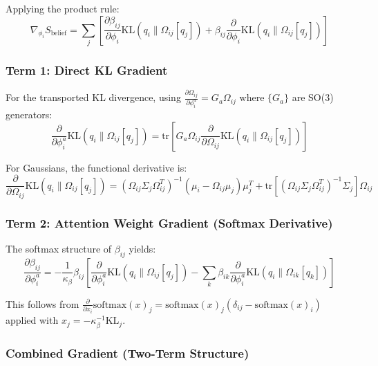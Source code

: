 \documentclass[11pt]{article}
\begin{document}
Applying the product rule:
\begin{equation}
\nabla_{\phi_i} S_{\mathrm{belief}} = \sum_j \left[ \frac{\partial \beta_{ij}}{\partial \phi_i} \mathrm{KL}(q_i \| \Omega_{ij}[q_j]) + \beta_{ij} \frac{\partial}{\partial \phi_i}\mathrm{KL}(q_i \| \Omega_{ij}[q_j]) \right]
\end{equation}

\subsubsection*{Term 1: Direct KL Gradient}

For the transported KL divergence, using $\frac{\partial \Omega_{ij}}{\partial \phi_i^a} = G_a \Omega_{ij}$ where $\{G_a\}$ are SO(3) generators:
\begin{equation}
\frac{\partial}{\partial \phi_i^a}\mathrm{KL}(q_i \| \Omega_{ij}[q_j]) = \mathrm{tr}\left[G_a \Omega_{ij} \frac{\partial}{\partial \Omega_{ij}}\mathrm{KL}(q_i \| \Omega_{ij}[q_j])\right]
\end{equation}

For Gaussians, the functional derivative is:
\begin{equation}
\frac{\partial}{\partial \Omega_{ij}}\mathrm{KL}(q_i \| \Omega_{ij}[q_j]) = (\Omega_{ij}\Sigma_j\Omega_{ij}^T)^{-1}(\mu_i - \Omega_{ij}\mu_j)\mu_j^T + \mathrm{tr}\left[(\Omega_{ij}\Sigma_j\Omega_{ij}^T)^{-1}\Sigma_j\right]\Omega_{ij}
\end{equation}

\subsubsection*{Term 2: Attention Weight Gradient (Softmax Derivative)}

The softmax structure of $\beta_{ij}$ yields:
\begin{equation}
\frac{\partial \beta_{ij}}{\partial \phi_i^a} = -\frac{1}{\kappa_\beta} \beta_{ij} \left[\frac{\partial}{\partial \phi_i^a}\mathrm{KL}(q_i \| \Omega_{ij}[q_j]) - \sum_k \beta_{ik} \frac{\partial}{\partial \phi_i^a}\mathrm{KL}(q_i \| \Omega_{ik}[q_k])\right]
\end{equation}

This follows from $\frac{\partial}{\partial x_i}\mathrm{softmax}(x)_j = \mathrm{softmax}(x)_j(\delta_{ij} - \mathrm{softmax}(x)_i)$ applied with $x_j = -\kappa_\beta^{-1}\mathrm{KL}_j$.

\subsubsection*{Combined Gradient (Two-Term Structure)}
\end{document}
